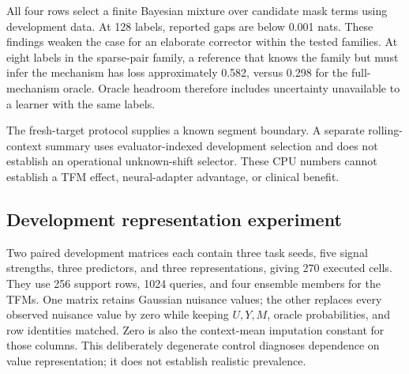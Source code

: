 \documentclass[10pt]{article}
\begin{document}
All four rows select a finite Bayesian mixture over candidate mask terms using development data. At 128 labels, reported gaps are below 0.001 nats. These findings weaken the case for an elaborate corrector within the tested families. At eight labels in the sparse-pair family, a reference that knows the family but must infer the mechanism has loss approximately 0.582, versus 0.298 for the full-mechanism oracle. Oracle headroom therefore includes uncertainty unavailable to a learner with the same labels.

The fresh-target protocol supplies a known segment boundary. A separate rolling-context summary uses evaluator-indexed development selection and does not establish an operational unknown-shift selector. These CPU numbers cannot establish a TFM effect, neural-adapter advantage, or clinical benefit.

\subsection{Development representation experiment}
Two paired development matrices each contain three task seeds, five signal strengths, three predictors, and three representations, giving 270 executed cells. They use 256 support rows, 1024 queries, and four ensemble members for the TFMs. One matrix retains Gaussian nuisance values; the other replaces every observed nuisance value by zero while keeping $U,Y,M$, oracle probabilities, and row identities matched. Zero is also the context-mean imputation constant for those columns. This deliberately degenerate control diagnoses dependence on value representation; it does not establish realistic prevalence.
\end{document}

